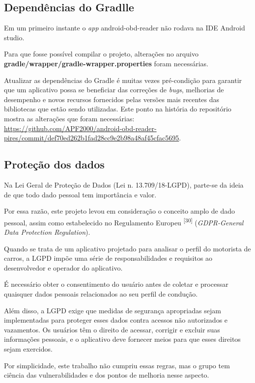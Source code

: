     \subsection{Dependências do Gradlle}

    Em um primeiro instante o \textit{app} android-obd-reader não rodava na IDE Android studio. 
    
    Para que fosse possível compilar o projeto, alterações no arquivo \textbf{gradle/wrapper/gradle-wrapper.properties} foram necessárias. 
    
    Atualizar as dependências do Gradle  é muitas vezes pré-condição para garantir que um aplicativo possa se beneficiar das correções de \textit{bugs}, melhorias de desempenho e novos recursos fornecidos pelas versões mais recentes das bibliotecas que estão sendo utilizadas. Este ponto na história do repositório mostra as alterações que foram necessárias: \url{https://github.com/APF2000/android-obd-reader-pires/commit/def70ed262b1fad28cc9e2b98a48af45cfac5695}.

    \subsection{Proteção dos dados}
    
    Na Lei Geral de Proteção de Dados (Lei n. 13.709/18-LGPD), parte-se da ideia de que todo dado pessoal tem importância e valor. 
    
    Por essa razão, este projeto levou em consideração o conceito amplo de dado pessoal, assim como estabelecido no Regulamento Europeu \textsuperscript{[30]} (\textit{GDPR-General Data Protection  Regulation}). 
    
    Quando se trata de um aplicativo projetado para analisar o perfil do motorista de carros, a LGPD impõe uma série de responsabilidades e requisitos ao desenvolvedor e operador do aplicativo. 
    
    É necessário obter o consentimento  do usuário antes de coletar e processar quaisquer dados pessoais relacionados ao seu perfil de condução.
    
    Além disso, a LGPD exige que medidas de segurança apropriadas sejam implementadas para proteger esses dados contra acessos não autorizados e vazamentos. Os usuários têm o direito de acessar, corrigir e excluir suas informações pessoais, e o aplicativo deve fornecer meios para que esses direitos sejam exercidos.

    Por simplicidade, este trabalho não cumpriu essas regras, mas o grupo tem ciência das vulnerabilidades e dos pontos de melhoria nesse aspecto.


